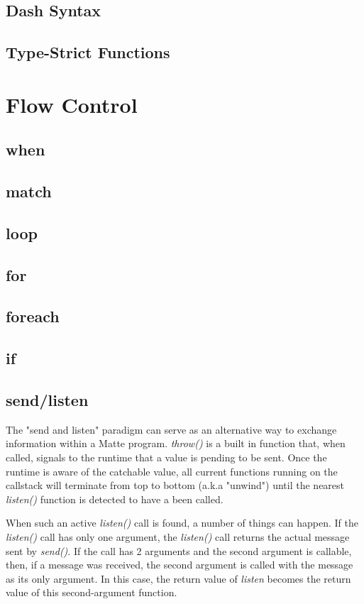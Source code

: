 \documentclass[12pt,letterpaper]{report}
\begin{document}
\section{Dash Syntax}\label{Dash Syntax}
\section{Type-Strict Functions}\label{Type-Strict Functions}
\chapter{Flow Control}\label{Flow Control}
\section{when}\label{when}
\section{match}\label{match}
\section{loop}\label{loop}
\section{for}\label{for}
\section{foreach}\label{foreach}
\section{if}\label{if}
\section{send/listen}\label{send/listen}

The "send and listen" paradigm can serve as an alternative way to exchange information within 
a Matte program. \textit{throw()} is a built in function that, when called, signals to the runtime
that a value is pending to be sent. Once the runtime is aware of the catchable value, all current 
functions running on the callstack will terminate from top to bottom (a.k.a "unwind") until the nearest
\textit{listen()} function is detected to have a been called.

When such an active \textit{listen()} call is found, a number of things can happen.
If the \textit{listen()} call has only one argument, the \textit{listen()} call returns 
the actual message sent by \textit{send()}. If the call has 2 arguments and the second 
argument is callable, then, if a message was received, the second argument is called 
with the message as its only argument. In this case, the return value of \textit{listen} 
becomes the return value of this second-argument function.
\end{document}
